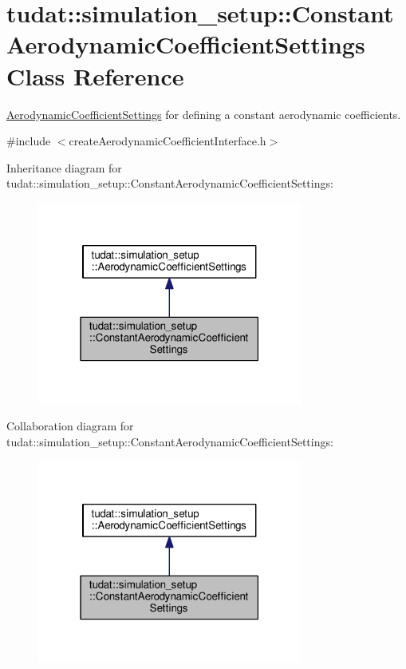 \hypertarget{classtudat_1_1simulation__setup_1_1ConstantAerodynamicCoefficientSettings}{}\section{tudat\+:\+:simulation\+\_\+setup\+:\+:Constant\+Aerodynamic\+Coefficient\+Settings Class Reference}
\label{classtudat_1_1simulation__setup_1_1ConstantAerodynamicCoefficientSettings}


\hyperlink{classtudat_1_1simulation__setup_1_1AerodynamicCoefficientSettings}{Aerodynamic\+Coefficient\+Settings} for defining a constant aerodynamic coefficients.  




{\ttfamily \#include $<$create\+Aerodynamic\+Coefficient\+Interface.\+h$>$}



Inheritance diagram for tudat\+:\+:simulation\+\_\+setup\+:\+:Constant\+Aerodynamic\+Coefficient\+Settings\+:
\nopagebreak
\begin{figure}[H]
\begin{center}
\leavevmode
\includegraphics[width=247pt]{classtudat_1_1simulation__setup_1_1ConstantAerodynamicCoefficientSettings__inherit__graph}
\end{center}
\end{figure}


Collaboration diagram for tudat\+:\+:simulation\+\_\+setup\+:\+:Constant\+Aerodynamic\+Coefficient\+Settings\+:
\nopagebreak
\begin{figure}[H]
\begin{center}
\leavevmode
\includegraphics[width=247pt]{classtudat_1_1simulation__setup_1_1ConstantAerodynamicCoefficientSettings__coll__graph}
\end{center}
\end{figure}
